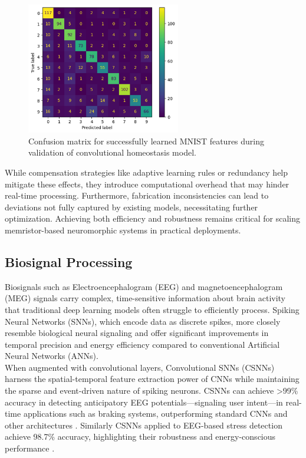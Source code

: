 \begin{figure}[!t]
    \centerline{\includegraphics[width=0.6\textwidth]{Chapter7/Figs/e.png}}
    \caption[Confusion matrix of convolutional homeostasis model.]{Confusion matrix for successfully learned MNIST features during validation of convolutional homeostasis model.}
    \label{fig:7e}
\end{figure}

\noindent While compensation strategies like adaptive learning rules or redundancy help mitigate these effects, they introduce computational overhead that may hinder real-time processing. Furthermore, fabrication inconsistencies can lead to deviations not fully captured by existing models, necessitating further optimization. Achieving both efficiency and robustness remains critical for scaling memristor-based neuromorphic systems in practical deployments.


\subsection{Biosignal Processing}

Biosignals such as Electroencephalogram (EEG) and magnetoencephalogram (MEG) signals carry complex, time-sensitive information about brain activity that traditional deep learning models often struggle to efficiently process. Spiking Neural Networks (SNNs), which encode data as discrete spikes, more closely resemble biological neural signaling and offer significant improvements in temporal precision and energy efficiency compared to conventional Artificial Neural Networks (ANNs).\\

\noindent When augmented with convolutional layers, Convolutional SNNs (CSNNs) harness the spatial-temporal feature extraction power of CNNs while maintaining the sparse and event-driven nature of spiking neurons. CSNNs can achieve >99\% accuracy in detecting anticipatory EEG potentials—signaling user intent—in real-time applications such as braking systems, outperforming standard CNNs and other architectures \cite{lutes2024convolutional}. Similarly CSNNs applied to EEG-based stress detection achieve 98.7\% accuracy, highlighting their robustness and energy-conscious performance \cite{Joshi2025-sa}. \\

